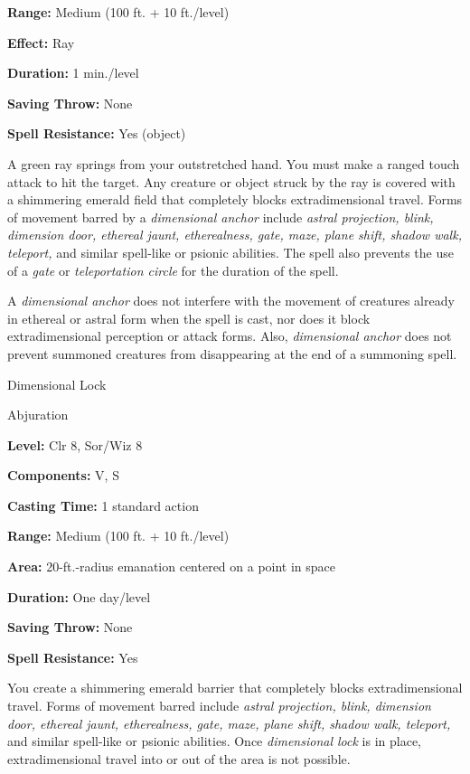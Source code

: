 \documentclass{article}
\begin{document}
\textbf{Range: }Medium (100 ft. + 10 ft./level)

\textbf{Effect:} Ray

\textbf{Duration:} 1 min./level

\textbf{Saving Throw:} None

\textbf{Spell Resistance:} Yes (object)

A green ray springs from your outstretched hand. You must make a ranged touch attack 
to hit the target. Any creature or object struck by the ray is covered with a shimmering 
emerald field that completely blocks extradimensional travel. Forms of movement 
barred by a \textit{dimensional anchor }include \textit{astral projection, blink, 
dimension door, ethereal jaunt, etherealness, gate, maze, plane shift, shadow walk, 
teleport, }and similar spell-like or psionic abilities. The spell also prevents 
the use of a \textit{gate }or \textit{teleportation circle }for the duration of 
the spell.

A \textit{dimensional anchor }does not interfere with the movement of creatures 
already in ethereal or astral form when the spell is cast, nor does it block extradimensional 
perception or attack forms. Also, \textit{dimensional anchor }does not prevent 
summoned creatures from disappearing at the end of a summoning spell.

\vspace{12pt}
Dimensional Lock

Abjuration

\textbf{Level:} Clr 8, Sor/Wiz 8

\textbf{Components:} V, S

\textbf{Casting Time:} 1 standard action

\textbf{Range: }Medium (100 ft. + 10 ft./level)

\textbf{Area:} 20-ft.-radius emanation centered on a point in space

\textbf{Duration:} One day/level

\textbf{Saving Throw:} None

\textbf{Spell Resistance:} Yes

You create a shimmering emerald barrier that completely blocks extradimensional 
travel. Forms of movement barred include \textit{astral projection, blink, dimension 
door, ethereal jaunt, etherealness, gate, maze, plane shift, shadow walk, teleport, 
}and similar spell-like or psionic abilities. Once \textit{dimensional lock }is 
in place, extradimensional travel into or out of the area is not possible.
\end{document}
